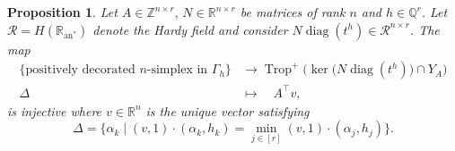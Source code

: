 \documentclass{article}
\newtheorem{proposition}[theorem]{Proposition}
\theoremstyle{definition}
\DeclareMathOperator{\Trop}{Trop}
\DeclareMathOperator{\diag}{diag}
\newcommand{\Z}{\mathbb{Z}}
\begin{document}
\begin{proposition}
\label{Prop:InjMapPosDec}
Let  $A  \in \Z^{n \times r},\, N \in \mathbb{R}^{n \times r}$ be matrices of rank $n$ and $h \in \mathbb{Q}^r$. Let $\mathcal{R} = H(\mathbb{R}_{\text{an}^*})$ denote the Hardy field and consider $N \diag(t^h) \in \mathcal{R}^{n \times r}$. The map 
      \begin{align*}
          \Big\{ \text{positively decorated } n\text{-simplex in } \Gamma_h \Big\} &\to \Trop^+\Big(\ker\big( N \diag(t^h)  \big)\cap Y_A \Big) \\
        \Delta \quad &\mapsto \quad A^\top v,
      \end{align*}
     is injective where $v \in \mathbb{R}^n$ is the unique vector satisfying
      \[
\Delta = \big\{ \alpha_k \mid  (v,1) \cdot (\alpha_k,h_k) = \min_{j \in [r]} (v,1) \cdot (\alpha_j,h_j) \big\} .\]
\end{proposition}
\end{document}
